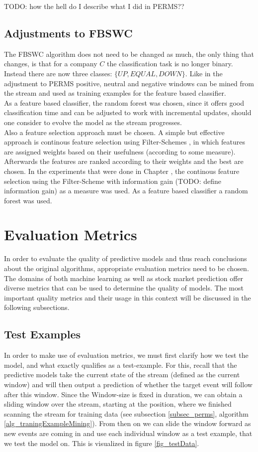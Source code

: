  TODO: how the hell do I describe what I did in PERMS??

\subsection{Adjustments to FBSWC}
The FBSWC algorithm does not need to be changed as much, the only thing that changes, is that for a company $C$ the classification task is no longer binary. Instead there are now three classes: $\{UP,EQUAL,DOWN\}$. Like in the adjustment to PERMS positive, neutral and negative windows can be mined from the stream and used as training examples for the feature based classifier. \\
As a feature based classifier, the random forest was chosen, since it offers good classification time and can be adjusted to work with incremental updates, should one consider to evolve the model as the stream progresses.\\
Also a feature selection approach must be chosen. A simple but effective approach is continous feature selection using Filter-Schemes \cite{molina2002feature}, in which features are assigned weights based on their usefulness (according to some measure). Afterwards the features are ranked according to their weights and the best are chosen. In the experiments that were done in Chapter , the continous feature selection using the Filter-Scheme with information gain (TODO: define information gain) as a measure was used. As a feature based classifier a random forest was used.

\section{Evaluation Metrics}
\label{sec_evaluationMetrics}

In order to evaluate the quality of predictive models and thus reach conclusions about the original algorithms, appropriate evaluation metrics need to be chosen. The domains of both machine learning as well as stock market prediction offer diverse metrics that can be used to determine the quality of models. The most important quality metrics and their usage in this context will be discussed in the following subsections.

\subsection{Test Examples}
In order to make use of evaluation metrics, we must first clarify how we test the model, and what exactly qualifies as a test-example. For this, recall that the predictive models take the current state of the stream (defined as the current window) and will then output a prediction of whether the target event will follow after this window. Since the Window-size is fixed in duration, we can obtain a sliding window over the stream, starting at the position, where we finished scanning the stream for training data (see subsection \ref{subsec_perms}, algorithm \ref{alg_traningExampleMining}). From then on we can slide the window forward as new events are coming in and use each individual window as a test example, that we test the model on. This is visualized in figure \ref{fig_testData}.


